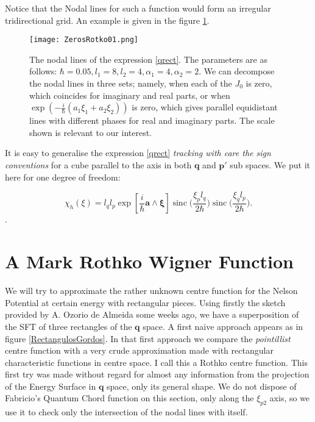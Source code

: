 \documentclass[a4paper,12pt]{article}
\newcommand{\ihb}{\frac{i}{\hbar}}
\newcommand{\qfase}{\mathbf{q}}
\newcommand{\pfase}{\mathbf{p}}
\newcommand{\xifase}{ {\boldsymbol{\xi}} }
\DeclareMathOperator*{\sinc}{sinc}
\begin{document}
Notice that the Nodal lines for such a function would form an
irregular tridirectional grid. An example is given in the 
figure \ref{example01}.

\begin{figure}
\centering
\texttt{[image: ZerosRotko01.png]}
\caption{The nodal lines of the expression \ref{qrect}.
The parameters are as follows: $\hbar=0.05, l_1=8,
l_2=4, \alpha_1=4, \alpha_2=2$. We can decompose
the nodal lines in three sets; namely, when each of
the $J_0$ is zero, which coincides for imaginary and real
parts, or when $\exp(-\ihb (a_1 \xi_1 + a_2 \xi_2))$ is zero, which
gives parallel equidistant lines with different phases for real
and imaginary parts. 
The scale  shown is relevant to our
interest.}\label{example01}
\end{figure}

It is easy to generalise the  expression \ref{qrect} 
\emph{tracking with care the sign conventions}
for a cube parallel to
the axis in both $\qfase$ and $\pfase'$ sub spaces. We put it here
for one degree of freedom:

\begin{equation}\label{total}
\chi_h (\xi)=l_q l_p
\exp [\ihb \mathbf{a}\wedge\xifase]
\sinc \Big( \frac{\xi_p l_q}{2\hbar} \Big)
\sinc \Big( \frac{\xi_q l_p}{2\hbar} \Big).
\end{equation}.


\section{A Mark Rothko Wigner Function}

We will try to approximate the rather unknown centre
function for the Nelson Potential at certain energy with rectangular
pieces. Using firstly the sketch provided by A. Ozorio de Almeida 
some weeks ago, we have a superposition of the
SFT of three rectangles of the $\qfase$ space. A first naive approach appears
as in figure \ref{RectangulosGordos}. In that first approach
we compare the \emph{pointillist} centre function with a very crude
approximation made with rectangular characteristic functions
in centre space. I call this a Rothko centre function. 
This first try was made without regard for almost any information
from the projection of the Energy Surface in $\qfase$ space,
only its general shape. We do not dispose of Fabricio's Quantum Chord
function on this section, only along the $\xi_{p2}$ axis,
so we use it to check only the intersection of the nodal lines with itself.
\end{document}
